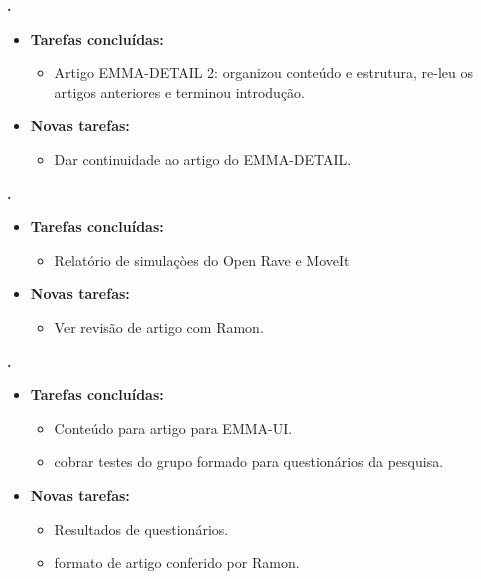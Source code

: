 	
	  \textbf{\elael.} 
	\begin{itemize}
		\item \textbf{Tarefas concluídas:}
			\begin{itemize}    
				\item Artigo EMMA-DETAIL 2: organizou conteúdo e estrutura, re-leu os
				artigos anteriores e terminou introdução.
			\end{itemize}
		
		\item \textbf{Novas tarefas:}
			\begin{itemize} 
			    \item Dar continuidade ao artigo do EMMA-DETAIL.
			\end{itemize}
	\end{itemize}			
			
  \textbf{\renan.} 
	\begin{itemize}
		\item \textbf{Tarefas concluídas:}
			\begin{itemize}    
				\item Relatório de simulaçòes do Open Rave e MoveIt
			\end{itemize}
		
		\item \textbf{Novas tarefas:}
			\begin{itemize} 
			    \item Ver revisão de artigo com Ramon.
			\end{itemize}
	\end{itemize}	
			
   \textbf{\julia.} 
	\begin{itemize}
		\item \textbf{Tarefas concluídas:}
			\begin{itemize}    
				\item Conteúdo para artigo para EMMA-UI. 
				\item cobrar testes do grupo formado para questionários da pesquisa.
			\end{itemize}
		
		\item \textbf{Novas tarefas:}
			\begin{itemize} 
			    \item Resultados de questionários.
			    \item formato de artigo conferido por Ramon.
			\end{itemize}
	\end{itemize}		




